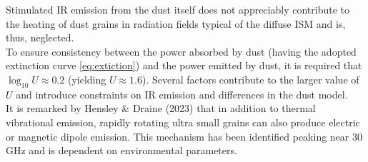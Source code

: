 Stimulated IR emission from the dust itself does not appreciably contribute to the heating of dust grains in radiation fields typical of the diffuse ISM and is, thus, neglected.\\
To ensure consistency between the power absorbed by dust (having the adopted extinction curve \ref{eq:extiction}) and the power emitted by dust, it is required that $\log_{10} U \approx 0.2$ (yielding $U \approx 1.6$). Several factors contribute to the larger value of $U$ and introduce constraints on IR emission and differences in the dust model.\\
It is remarked by Hensley \& Draine (2023)\cite{HenDraine2023} that in addition to thermal vibrational emission, rapidly rotating ultra small grains can also produce electric or magnetic dipole emission. This mechanism has been identified peaking near 30 GHz and is dependent on environmental parameters.

